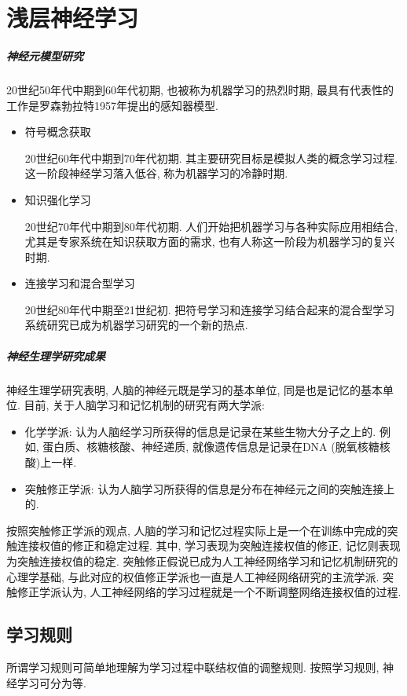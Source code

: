 \section{浅层神经学习}
\subparagraph{神经元模型研究}
 20世纪50年代中期到60年代初期, 也被称为机器学习的热烈时期, 最具有代表性的工作是罗森勃拉特1957年提出的感知器模型.
\begin{itemize}
\item 符号概念获取

    20世纪60年代中期到70年代初期. 其主要研究目标是模拟人类的概念学习过程. 这一阶段神经学习落入低谷, 称为机器学习的冷静时期.
\item 知识强化学习

    20世纪70年代中期到80年代初期. 人们开始把机器学习与各种实际应用相结合, 尤其是专家系统在知识获取方面的需求, 也有人称这一阶段为机器学习的复兴时期.
\item 连接学习和混合型学习

    20世纪80年代中期至21世纪初. 把符号学习和连接学习结合起来的混合型学习系统研究已成为机器学习研究的一个新的热点.
\end{itemize}
\subparagraph{神经生理学研究成果}
神经生理学研究表明, 人脑的神经元既是学习的基本单位, 同是也是记忆的基本单位. 目前, 关于人脑学习和记忆机制的研究有两大学派:
\begin{itemize}
    \item 化学学派: 认为人脑经学习所获得的信息是记录在某些生物大分子之上的. 例如, 蛋白质、核糖核酸、神经递质, 就像遗传信息是记录在DNA (脱氧核糖核酸)上一样.
    \item 突触修正学派: 认为人脑学习所获得的信息是分布在神经元之间的突触连接上的.
\end{itemize}

按照突触修正学派的观点, 人脑的学习和记忆过程实际上是一个在训练中完成的突触连接权值的修正和稳定过程. 其中, 学习表现为突触连接权值的修正, 记忆则表现为突触连接权值的稳定.
突触修正假说已成为人工神经网络学习和记忆机制研究的心理学基础, 与此对应的权值修正学派也一直是人工神经网络研究的主流学派.
突触修正学派认为, 人工神经网络的学习过程就是一个不断调整网络连接权值的过程.
\subsection{学习规则}
所谓学习规则可简单地理解为学习过程中联结权值的调整规则. 按照学习规则, 神经学习可分为等.
